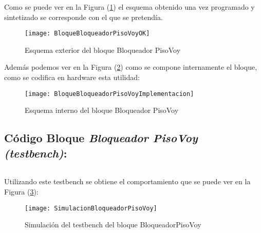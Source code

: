     \inputminted[frame=lines,fontsize=\footnotesize,linenos]{vhdl}{CodeFiles/BloqueadorPisoVoy.vhd}
	Como se puede ver en la Figura (\ref{fig:BloqueBloqueadorPisoVoyOK}) el esquema obtenido una vez programado y sintetizado se corresponde con el que se pretendía.
    \begin{figure}[H]
		    \centering
		    \texttt{[image: BloqueBloqueadorPisoVoyOK]}
		    \caption{Esquema exterior del bloque Bloqueador PisoVoy}
		    \label{fig:BloqueBloqueadorPisoVoyOK}
	\end{figure}
    Además podemos ver en la Figura (\ref{fig:BloqueBloqueadorPisoVoyImplementacion}) como se compone internamente el bloque, como se codifica en hardware esta utilidad:
    \begin{figure}[H]
		    \centering
		    \texttt{[image: BloqueBloqueadorPisoVoyImplementacion]}
		    \caption{Esquema interno del bloque Bloqueador PisoVoy}
		    \label{fig:BloqueBloqueadorPisoVoyImplementacion}
	\end{figure}

\subsection{Código Bloque \textit{Bloqueador PisoVoy (testbench)}:} \label{code:BloqueadorpisoVoy_tb}
    \inputminted[frame=lines,fontsize=\footnotesize,linenos]{vhdl}{CodeFiles/BloqueadorPisoVoy_tb.vhd}

    Utilizando este testbench se obtiene el comportamiento que se puede ver en la Figura (\ref{fig:SimulacionBloqueadorPisoVoy}):

    \begin{figure}[H]
		    \centering
		    \texttt{[image: SimulacionBloqueadorPisoVoy]}
		    \caption{Simulación del testbench del bloque BloqueadorPisoVoy}
		    \label{fig:SimulacionBloqueadorPisoVoy}
	\end{figure}

